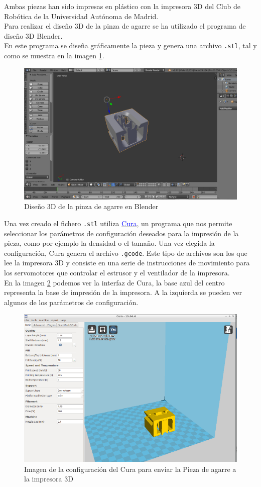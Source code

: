 \documentclass[twoside, 11pt]{epstfg}
\begin{document}
Ambas piezas han sido impresas en plástico con la impresora 3D del Club de Robótica de la Universidad Autónoma de Madrid.\\
Para realizar el diseño 3D de la pinza de agarre se ha utilizado el programa de diseño 3D Blender.\\
En este programa se diseña gráficamente la pieza y genera una archivo \texttt{.stl}, tal y como se muestra en la imagen \ref{fig::blender}. 
\begin{figure}[H]
	\centerline{
		\mbox{\includegraphics[width=.80\textwidth]{images/cameraBlender.png}}
	}
	\caption{ Diseño 3D de la pinza de agarre en Blender}
	\label{fig::blender}
\end{figure}

Una vez creado el fichero \texttt{.stl} utiliza \href{https://ultimaker.com/en/products/cura-software}{\textcolor{blue}{Cura}}, un programa que nos permite seleccionar los parámetros de configuración deseados para la impresión de la pieza, como por ejemplo la densidad o el tamaño. Una vez elegida la configuración, Cura genera el archivo \texttt{.gcode}. Este tipo de archivos son los que lee la impresora 3D y consiste en una serie de instrucciones de movimiento para los servomotores que controlar el estrusor y el ventilador de la impresora.\\
En la imagen \ref{Cura} podemos ver la interfaz de Cura, la base azul del centro representa la base de impresión de la impresora. A la izquierda se pueden ver algunos de los parámetros de configuración.

\begin{figure}[H]
	\centerline{
		\mbox{\includegraphics[width=.75\textwidth]{images/Cura2.png}}
	}
	\caption{Imagen de la configuración del Cura para enviar la Pieza de agarre a la impresora 3D}
	\label{Cura}
\end{figure}
 
\end{document}
